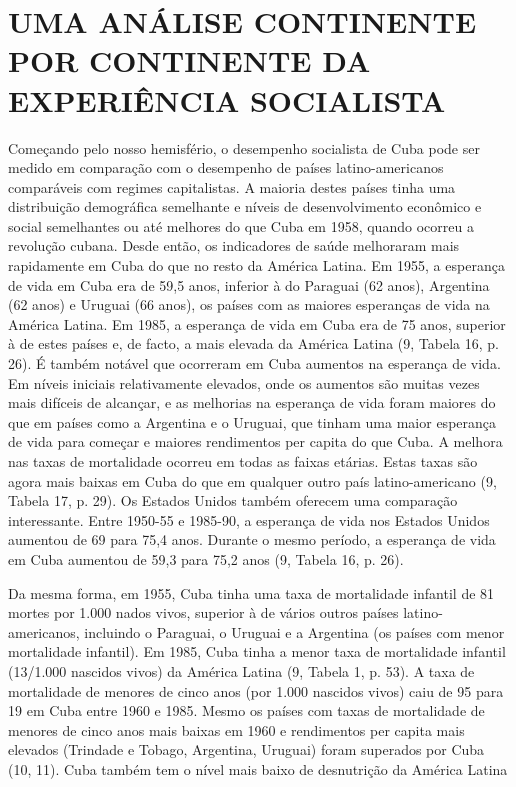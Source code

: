\documentclass[twocolumn,amsmath,amssymb,aps,pre,floatfix]{revtex4-2}
\begin{document}
\par

\section{UMA ANÁLISE CONTINENTE POR CONTINENTE DA EXPERIÊNCIA SOCIALISTA}

\par
Começando pelo nosso hemisfério, o desempenho socialista de Cuba pode ser medido em comparação com o desempenho de países latino-americanos comparáveis ​​com regimes capitalistas. A maioria destes países tinha uma distribuição demográfica semelhante e níveis de desenvolvimento econômico e social semelhantes ou até melhores do que Cuba em 1958, quando ocorreu a revolução cubana. Desde então, os indicadores de saúde melhoraram mais rapidamente em Cuba do que no resto da América Latina. Em 1955, a esperança de vida em Cuba era de 59,5 anos, inferior à do Paraguai (62 anos), Argentina (62 anos) e Uruguai (66 anos), os países com as maiores esperanças de vida na América Latina. Em 1985, a esperança de vida em Cuba era de 75 anos, superior à de estes países e, de facto, a mais elevada da América Latina (9, Tabela 16, p. 26). É também notável que ocorreram em Cuba aumentos na esperança de vida. Em níveis iniciais relativamente elevados, onde os aumentos são muitas vezes mais difíceis de alcançar, e as melhorias na esperança de vida foram maiores do que em países como a Argentina e o Uruguai, que tinham uma maior esperança de vida para começar e maiores rendimentos per capita do que Cuba. A melhora nas taxas de mortalidade ocorreu em todas as faixas etárias. Estas taxas são agora mais baixas em Cuba do que em qualquer outro país latino-americano (9, Tabela 17, p. 29). Os Estados Unidos também oferecem uma comparação interessante. Entre 1950-55 e 1985-90, a esperança de vida nos Estados Unidos aumentou de 69 para 75,4 anos. Durante o mesmo período, a esperança de vida em Cuba aumentou de 59,3 para 75,2 anos (9, Tabela 16, p. 26).
\par
Da mesma forma, em 1955, Cuba tinha uma taxa de mortalidade infantil de 81 mortes por 1.000 nados vivos, superior à de vários outros países latino-americanos, incluindo o Paraguai, o Uruguai e a Argentina (os países com menor mortalidade infantil). Em 1985, Cuba tinha a menor taxa de mortalidade infantil (13/1.000 nascidos vivos) da América Latina (9, Tabela 1, p. 53). A taxa de mortalidade de menores de cinco anos (por 1.000 nascidos vivos) caiu de 95 para 19 em Cuba entre 1960 e 1985. Mesmo os países com taxas de mortalidade de menores de cinco anos mais baixas em 1960 e rendimentos per capita mais elevados (Trindade e Tobago, Argentina, Uruguai) foram superados por Cuba (10, 11). Cuba também tem o nível mais baixo de desnutrição da América Latina
\end{document}
